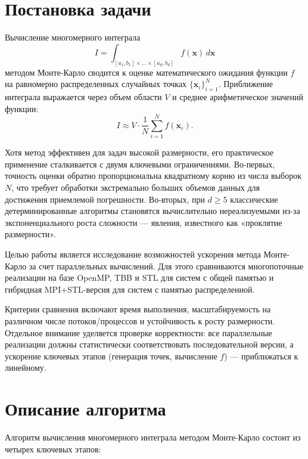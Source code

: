 \documentclass[a4paper,12pt]{article}
\begin{document}
\newpage

\section{Постановка задачи}

Вычисление многомерного интеграла 
\[
I = \int_{[a_1, b_1] \times \dots \times [a_d, b_d]} f(\mathbf{x}) \, d\mathbf{x}
\] 
методом Монте-Карло сводится к оценке математического ожидания функции \( f \) на равномерно распределенных случайных точках \( \{\mathbf{x}_i\}_{i=1}^N \). Приближение интеграла выражается через объем области \( V \) и среднее арифметическое значений функции:  
\[
I \approx V \cdot \frac{1}{N} \sum_{i=1}^N f(\mathbf{x}_i).
\]

Хотя метод эффективен для задач высокой размерности, его практическое применение сталкивается с двумя ключевыми ограничениями. Во-первых, точность оценки обратно пропорциональна квадратному корню из числа выборок \( N \), что требует обработки экстремально больших объемов данных для достижения приемлемой погрешности. Во-вторых, при \( d \geq 5 \) классические детерминированные алгоритмы становятся вычислительно нереализуемыми из-за экспоненциального роста сложности — явления, известного как «проклятие размерности».

Целью работы является исследование возможностей ускорения метода Монте-Карло за счет параллельных вычислений. Для этого сравниваются многопоточные реализации на базе OpenMP, TBB и STL для систем с общей памятью и гибридная MPI+STL-версия для систем с памятью распределенной. 

Критерии сравнения включают время выполнения, масштабируемость на различном числе потоков/процессов и устойчивость к росту размерности. Отдельное внимание уделяется проверке корректности: все параллельные реализации должны статистически соответствовать последовательной версии, а ускорение ключевых этапов (генерация точек, вычисление \( f \)) — приближаться к линейному. 

\newpage

\section{Описание алгоритма}

Алгоритм вычисления многомерного интеграла методом Монте-Карло состоит из четырех ключевых этапов:
\end{document}
